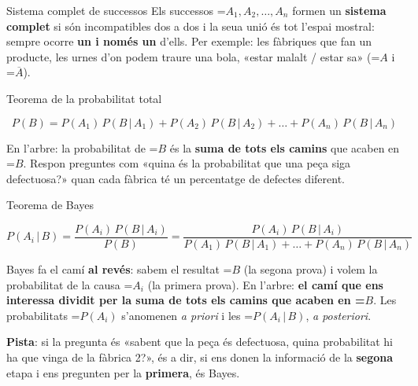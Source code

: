 \documentclass[11pt,a4paper]{article}
\newcommand{\fmm}[1]{\setbox0=\hbox{$#1$}\ifdim\wd0>\linewidth\[#1\]\else\mbox{\box0}\fi}
\newcommand{\fmuline}[1]{\textbf{\color{fmaccent}#1}}
\begin{document}
  
\begin{fmdef}{Sistema complet de successos}
Els successos \fmm{A_1, A_2,\dots,A_n} formen un \textbf{sistema complet} si són incompatibles dos a dos i la seua unió és tot l'espai mostral: sempre ocorre \textbf{un i només un} d'ells. Per exemple: les fàbriques que fan un producte, les urnes d'on podem traure una bola, «estar malalt / estar sa» (\fmm{A} i \fmm{\overline{A}}).
\end{fmdef}

  
\begin{fmprop}{Teorema de la probabilitat total}

\[P(B)=P(A_1)\,P(B\,|\,A_1)+P(A_2)\,P(B\,|\,A_2)+\dots+P(A_n)\,P(B\,|\,A_n)\]

      

En l'arbre: la probabilitat de \fmm{B} és la \textbf{suma de tots els camins} que acaben en \fmm{B}. Respon preguntes com «quina és la probabilitat que una peça siga defectuosa?» quan cada fàbrica té un percentatge de defectes diferent.
\end{fmprop}

  
\begin{fmprop}{Teorema de Bayes}

\[P(A_i\,|\,B)=\frac{P(A_i)\,P(B\,|\,A_i)}{P(B)}=\frac{P(A_i)\,P(B\,|\,A_i)}{P(A_1)\,P(B\,|\,A_1)+\dots+P(A_n)\,P(B\,|\,A_n)}\]

      

Bayes fa el camí \textbf{al revés}: sabem el resultat \fmm{B} (la segona prova) i volem la probabilitat de la causa \fmm{A_i} (la primera prova). En l'arbre: \textbf{el camí que ens interessa dividit per la suma de tots els camins que acaben en \fmm{B}}. Les probabilitats \fmm{P(A_i)} s'anomenen \emph{a priori} i les \fmm{P(A_i\,|\,B)}, \emph{a posteriori}.

      
\begin{fmnote}\fmuline{Pista}: si la pregunta és «sabent que la peça és defectuosa, quina probabilitat hi ha que vinga de la fàbrica 2?», és a dir, si ens donen la informació de la \textbf{segona} etapa i ens pregunten per la \textbf{primera}, és Bayes.\end{fmnote}
\end{fmprop}
\end{document}
